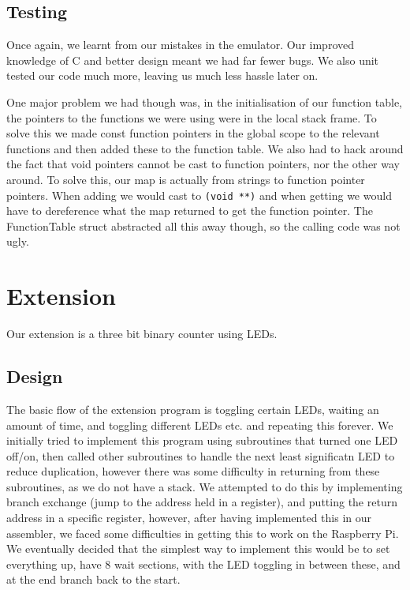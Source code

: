 \documentclass[a4paper]{article}
\begin{document}
\subsection{Testing}

Once again, we learnt from our mistakes in the emulator. Our improved knowledge of C and better design meant we had far fewer bugs. We also unit tested our code much more, leaving us much less hassle later on. 

One major problem we had though was, in the initialisation of our function table, the pointers to the functions we were using were in the local stack frame. To solve this we made const function pointers in the global scope to the relevant functions and then added these to the function table. We also had to hack around the fact that void pointers cannot be cast to function pointers, nor the other way around. To solve this, our map is actually from strings to function pointer pointers. When adding we would cast to \texttt{(void **)} and when getting we would have to dereference what the map returned to get the function pointer. The FunctionTable struct abstracted all this away though, so the calling code was not ugly.


\section{Extension}

Our extension is a three bit binary counter using LEDs.

\subsection{Design}
The basic flow of the extension program is toggling certain LEDs, waiting an amount of time, and toggling different LEDs etc. and repeating this forever.
We initially tried to implement this program using subroutines that turned one LED off/on, then called other subroutines to handle the next least significatn LED to reduce duplication, however there was some difficulty in returning from these subroutines, as we do not have a stack.
We attempted to do this by implementing branch exchange (jump to the address held in a register), and putting the return address in a specific register, however, after having implemented this in our assembler, we faced some difficulties in getting this to work on the Raspberry Pi.
We eventually decided that the simplest way to implement this would be to set everything up, have 8 wait sections, with the LED toggling in between these, and at the end branch back to the start.
\end{document}
